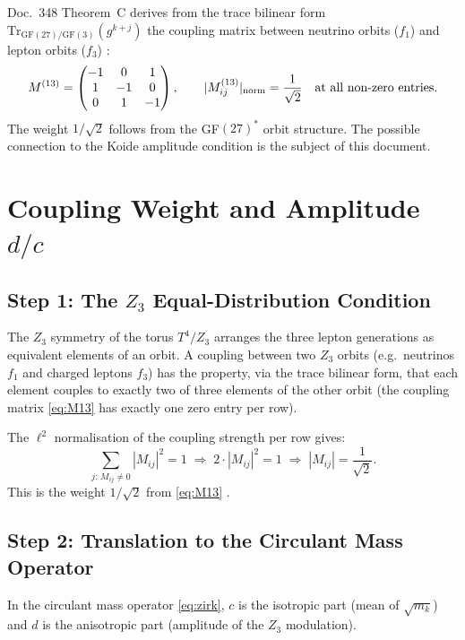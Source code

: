 Doc.~348 Theorem~C derives from the trace bilinear form
$\mathrm{Tr}_{\mathrm{GF}(27)/\mathrm{GF}(3)}(g^{k+j})$
the coupling matrix between neutrino orbits ($f_1$) and
lepton orbits ($f_3$) \BM:
\begin{equation}
  M^{(13)} = \begin{pmatrix} -1 & 0 & 1 \\ 1 & -1 & 0 \\ 0 & 1 & -1 \end{pmatrix},
  \qquad |M^{(13)}_{ij}|_{\rm norm} = \frac{1}{\sqrt{2}}
  \quad\text{at all non-zero entries.}
  \label{eq:M13}
\end{equation}
The weight $1/\sqrt{2}$ follows from the GF$(27)^*$ orbit structure.
The possible connection to the Koide amplitude condition is the subject of this document.

\section{Coupling Weight and Amplitude $d/c$}

\subsection*{Step 1: The $Z_3$ Equal-Distribution Condition}

The $Z_3$ symmetry of the torus $T^4/Z_3$ arranges the three lepton generations
as equivalent elements of an orbit. A coupling between two $Z_3$ orbits
(e.g.\ neutrinos $f_1$ and charged leptons $f_3$) has the property, via the
trace bilinear form, that each element couples to exactly two of three elements
of the other orbit (the coupling matrix \eqref{eq:M13} has exactly one zero
entry per row).

The $\ell^2$ normalisation of the coupling strength per row gives:
\begin{equation}
  \sum_{j:\,M_{ij}\neq 0} |M_{ij}|^2 = 1
  \;\Longrightarrow\;
  2\cdot|M_{ij}|^2 = 1
  \;\Longrightarrow\;
  |M_{ij}| = \frac{1}{\sqrt{2}}.
  \label{eq:norm}
\end{equation}
This is the weight $1/\sqrt{2}$ from \eqref{eq:M13} \BM.

\subsection*{Step 2: Translation to the Circulant Mass Operator}

In the circulant mass operator \eqref{eq:zirk}, $c$ is the isotropic part
(mean of $\sqrt{m_k}$) and $d$ is the anisotropic part (amplitude of the
$Z_3$ modulation).

